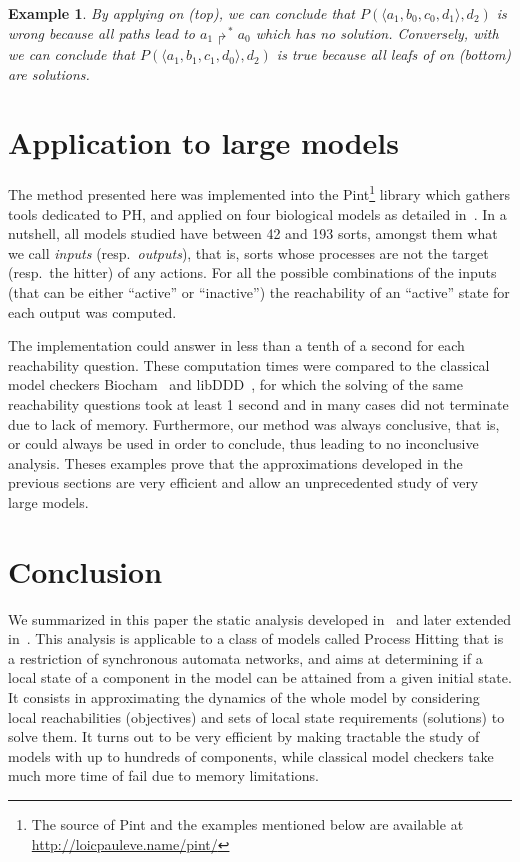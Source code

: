 \documentclass{movep}
\def\pref{\prettyref}
\newtheorem*{example*}{Example}{\itshape}{}
\newcommand{\PHfrappeB}{\Rsh}
\newcommand{\PHobjectif}[2]{\mbox{$#1\PHfrappeB^*\!#2$}}
\newcommand{\PHobj}{\PHobjectif}
\newcommand{\PHetat}[1]{\mbox{$\langle #1 \rangle$}}
\newcounter{la}
\newcommand{\resp}{resp.\ }
\begin{document}
\begin{example*}
  By applying \pref{th:oa} on \pref{fig:glc}(top),
  we can conclude that $P(\PHetat{a_1,b_0,c_0,d_1}, d_2)$ is wrong
  because all paths lead to $\PHobj{a_1}{a_0}$ which has no solution.
  Conversely, with \pref{th:ua} we can conclude that
  $P(\PHetat{a_1,b_1,c_1,d_0}, d_2)$ is true
  because all leafs of on \pref{fig:glc}(bottom) are solutions.
\end{example*}




\section{Application to large models}
\label{sec:examples}

The method presented here was implemented into the
Pint\footnote{The source of Pint and the examples mentioned below are available at
\url{http://loicpauleve.name/pint/}}
library which gathers tools dedicated to PH, and
applied on four biological models as detailed in~\cite{PMR12-MSCS}.
In a nutshell, all models studied have between 42 and 193 sorts,
amongst them what we call \emph{inputs} (\resp \emph{outputs}),
that is, sorts whose processes are not the target (\resp the hitter) of any actions.
For all the possible combinations of the inputs
(that can be either “active” or “inactive”)
the reachability of an “active” state for each output was computed.

The implementation could answer in less than a tenth of a second for each
reachability question.
These computation times were compared to the classical model checkers Biocham~\cite{fages2008formal}
and libDDD~\cite{couvreur2002data}, for which the solving of the same reachability questions
took at least 1 second and in many cases did not terminate due to lack of memory.
Furthermore, our method was always conclusive,
that is, \pref{th:oa} or \pref{th:ua} could always be used in order to conclude,
thus leading to no inconclusive analysis.
Theses examples prove that the approximations developed in the previous sections are very efficient
and allow an unprecedented study of very large models.



\section{Conclusion}
\label{sec:conclusion}

We summarized in this paper the static analysis developed in~\cite{PMR12-MSCS}
and later extended in~\cite{FPMR13-CS2Bio}.
This analysis is applicable to a class of models called Process Hitting that is a
restriction of synchronous automata networks,
and aims at determining if a local state of a component in the model can be attained from a given
initial state.
It consists in approximating the dynamics of the whole model by considering local
reachabilities (objectives)
and sets of local state requirements (solutions) to solve them.
It turns out to be very efficient by making tractable the study of models
with up to hundreds of components,
while classical model checkers take much more time of fail due to memory limitations.
\end{document}
